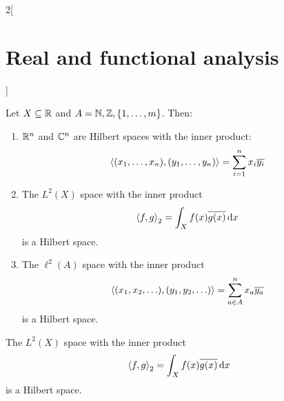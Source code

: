 \documentclass[../../../main_math.tex]{subfiles}
\begin{document}
\begin{multicols}{2}[\section{Real and functional analysis}]
  \begin{proposition}
    Let $X\subseteq \mathbb{R}$ and $A=\mathbb{N},\mathbb{Z},\{1,\ldots,m\}$. Then:
    \begin{enumerate}
      \item $\mathbb{R}^n$ and $\mathbb{C}^n$ are Hilbert spaces with the inner product: $${\left\langle(x_1,\ldots,x_n),(y_1,\ldots,y_n)\right\rangle}=\sum_{i= 1}^nx_i\overline{y_i}$$
      \item The $L^2(X)$ space with the inner product $${\left\langle f,g\right\rangle}_2=\int_Xf(x)\overline{g(x)}\dd{x}$$ is a Hilbert space.
      \item The $\ell^2(A)$ space with the inner product $${\left\langle(x_1,x_2,\ldots),(y_1,y_2,\ldots)\right\rangle}=\sum_{a\in A}^nx_a\overline{y_a}$$ is a Hilbert space.
    \end{enumerate}
    The $L^2(X)$ space with the inner product $${\left\langle f,g\right\rangle}_2=\int_Xf(x)\overline{g(x)}\dd{x}$$ is a Hilbert space.
  \end{proposition}

\end{multicols}
\end{document}
